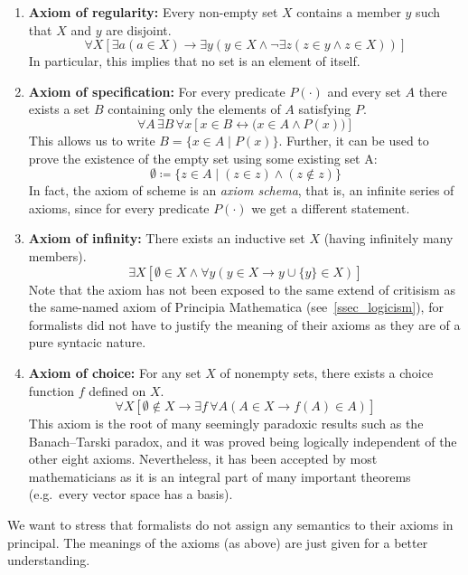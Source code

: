 \documentclass[hidelinks]{article}
\begin{document}
\begin{enumerate}
    \item \textbf{Axiom of regularity:} Every non-empty set $X$ contains a member $y$ such that $X$ and $y$ are disjoint.
\begin{equation*}
\forall X [\exists a ( a \in X) \rightarrow \exists y ( y \in X \land \lnot \exists z (z \in y \land z \in X))]
\end{equation*}
In particular, this implies that no set is an element of itself.
    \item \textbf{Axiom of specification:} For every predicate $P(\cdot)$ and every set $A$ there exists a set $B$ containing only the elements of $A$ satisfying $P$.
\begin{equation*}
\forall A\,\exists B\,\forall x[x\in B \leftrightarrow \bigl(x\in A \land P(x)\bigr)]
\end{equation*}
This allows us to write $B=\{x\in A\mid P(x)\}$. Further, it can be used to prove the existence of the empty set using some existing set A:
\begin{equation*}
\emptyset\coloneqq\{z\in A\mid (z\in z)\land(z\notin z)\}
\end{equation*}
In fact, the axiom of scheme is an \textit{axiom schema}, that is, an infinite series of axioms, since for every predicate $P(\cdot)$ we get a different statement.
    \item \textbf{Axiom of infinity:} There exists an inductive set $X$ (having infinitely many members).
\begin{equation*}
\exists X \left [\emptyset \in X \land \forall y (y \in X \rightarrow y\cup\{y\}  \in X)\right]
\end{equation*}
Note that the axiom has not been exposed to the same extend of critisism as the same-named axiom of Principia Mathematica (see~\ref{ssec_logicism}), for formalists did not have to justify the meaning of their axioms as they are of a pure syntacic nature.
    \item \textbf{Axiom of choice:} For any set $X$ of nonempty sets, there exists a choice function $f$ defined on $X$. 
\begin{equation*}
\forall X \left[ \emptyset \notin X \rightarrow \exists f\,\forall A(A\in X\rightarrow f(A) \in A ) \right]
\end{equation*}
This axiom is the root of many seemingly paradoxic results such as the Banach–Tarski paradox, and it was proved being logically independent of the other eight axioms. Nevertheless, it has been accepted by most mathematicians as it is an integral part of many important theorems (e.g.\ every vector space has a basis).
\end{enumerate}
\normalsize
We want to stress that formalists do not assign any semantics to their axioms in principal. The meanings of the axioms (as above) are just given for a better understanding.
\end{document}
